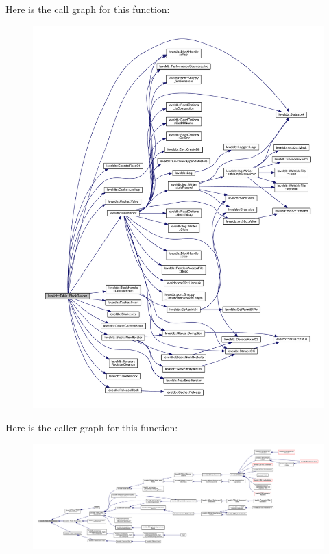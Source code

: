 Here is the call graph for this function\+:\nopagebreak
\begin{figure}[H]
\begin{center}
\leavevmode
\includegraphics[width=350pt]{classleveldb_1_1_table_a93b3e7e277493cbc63a55e2b141b1f30_cgraph}
\end{center}
\end{figure}




Here is the caller graph for this function\+:
\nopagebreak
\begin{figure}[H]
\begin{center}
\leavevmode
\includegraphics[width=350pt]{classleveldb_1_1_table_a93b3e7e277493cbc63a55e2b141b1f30_icgraph}
\end{center}
\end{figure}



